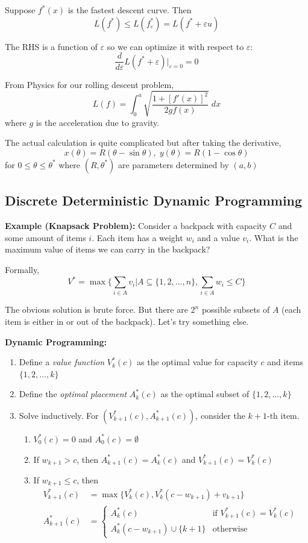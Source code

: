 \documentclass[12pt]{report}
\newcommand{\ep}{\varepsilon}
\newcommand{\sub}{\subseteq}
\begin{document}
    Suppose $f^*(x)$ is the fastest descent curve. Then 
    \[L(f^*) \leq L(f^*_{\ep}) = L(f^* + \ep u)\]

    The RHS is a function of $\ep$ so we can optimize it with respect to $\ep$:
    \[\frac{d}{d\ep} L(f^* + \ep)\bigg\vert_{\ep = 0} = 0\]

    From Physics for our rolling descent problem, 
    \[L(f) = \int_0^a \sqrt{\frac{1 + [f'(x)]^2}{2gf(x)}}\; dx\] 
    where $g$ is the acceleration due to gravity.

    The actual calculation is quite complicated but after taking the derivative, 
    \[x(\theta) = R(\theta - \sin \theta), \; y(\theta) = R(1 - \cos \theta)\]
    for $0 \leq \theta \leq \theta^*$ where $(R, \theta^*)$ are parameters determined by $(a, b)$

\subsection*{Discrete Deterministic Dynamic Programming}
    \textbf{Example (Knapsack Problem):} Consider a backpack with capacity $C$ and some amount of items $i$. Each item has a weight $w_i$ and a value $v_i$. What is the maximum value of items we can carry in the backpack? 

    Formally, 
    \[V^* = \max \{\sum_{i \in A} v_i \big\vert A \sub \{1, 2, \dots, n\}, \sum_{i \in A} w_i \leq C\}\]

    The obvious solution is brute force. But there are $2^n$ possible subsets of $A$ (each item is either in or out of the backpack). Let's try something else. 
    
    \textbf{Dynamic Programming:}
    \begin{enumerate}
        \item Define a \emph{value function} $V_k^*(c)$ as the optimal value for capacity $c$ and items $\{1, 2, \dots, k\}$
        \item Define the \emph{optimal placement} $A^*_k(c)$ as the optimal subset of $\{1, 2, \dots, k\}$
        \item Solve inductively. For $(V_{k+1}^*(c), A_{k+1}^*(c))$, consider the $k+1$-th item.
        \begin{enumerate}[label = (\alph*)]
            \item $V_0^*(c) = 0$ and $A_0^*(c) = \emptyset$ 
            \item If $w_{k+1} > c$, then $A_{k+1}^*(c) = A_k^*(c)$ and $V_{k+1}^*(c) = V_k^*(c)$
            \item If $w_{k+1} \leq c$, then 
            \begin{align*}
                V_{k+1}^*(c) &= \max\{V_k^*(c), V_k^*(c - w_{k+1}) + v_{k+1}\}\\
                A_{k+1}^*(c) &= \begin{cases}
                    A_k^*(c) & \text{if } V_{k+1}^*(c) = V_k^*(c)\\ 
                    A_k^*(c - w_{k+1}) \cup \{k+1\} & \text{otherwise}
                \end{cases}
            \end{align*}
        \end{enumerate}
    \end{enumerate}
\end{document}
